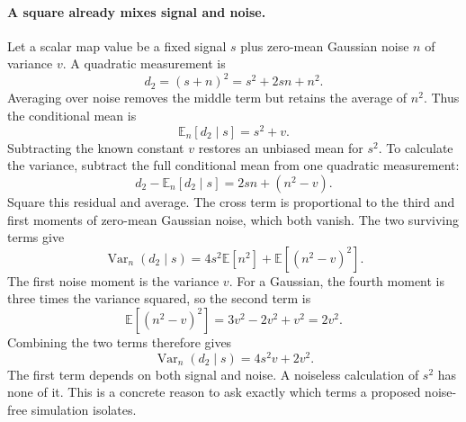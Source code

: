 \documentclass[11pt]{article}
\newcommand{\E}{\mathbb{E}}
\newcommand{\Var}{\operatorname{Var}}
\begin{document}
\paragraph{A square already mixes signal and noise.}
Let a scalar map value be a fixed signal $s$ plus zero-mean Gaussian noise
$n$ of variance $v$. A quadratic measurement is
\begin{equation}
 d_2=(s+n)^2=s^2+2sn+n^2.
\end{equation}
Averaging over noise removes the middle term but retains the average of
$n^2$. Thus the conditional mean is
\begin{equation}
 \E_n[d_2\mid s]=s^2+v.
\end{equation}
Subtracting the known constant $v$ restores an unbiased mean for $s^2$.
To calculate the variance, subtract the full conditional mean from one
quadratic measurement:
\begin{equation}
 d_2-\E_n[d_2\mid s]=2sn+(n^2-v).
\end{equation}
Square this residual and average. The cross term is proportional to the
third and first moments of zero-mean Gaussian noise, which both vanish.
The two surviving terms give
\begin{equation}
 \Var_n(d_2\mid s)=4s^2\E[n^2]+\E[(n^2-v)^2].
\end{equation}
The first noise moment is the variance $v$. For a Gaussian, the fourth
moment is three times the variance squared, so the second term is
\begin{equation}
 \E[(n^2-v)^2]=3v^2-2v^2+v^2=2v^2.
\end{equation}
Combining the two terms therefore gives
\begin{equation}
 \Var_n(d_2\mid s)=4s^2v+2v^2.
\end{equation}
The first term depends on both signal and noise. A noiseless calculation
of $s^2$ has none of it. This is a concrete reason to ask exactly which
terms a proposed noise-free simulation isolates.
\end{document}
